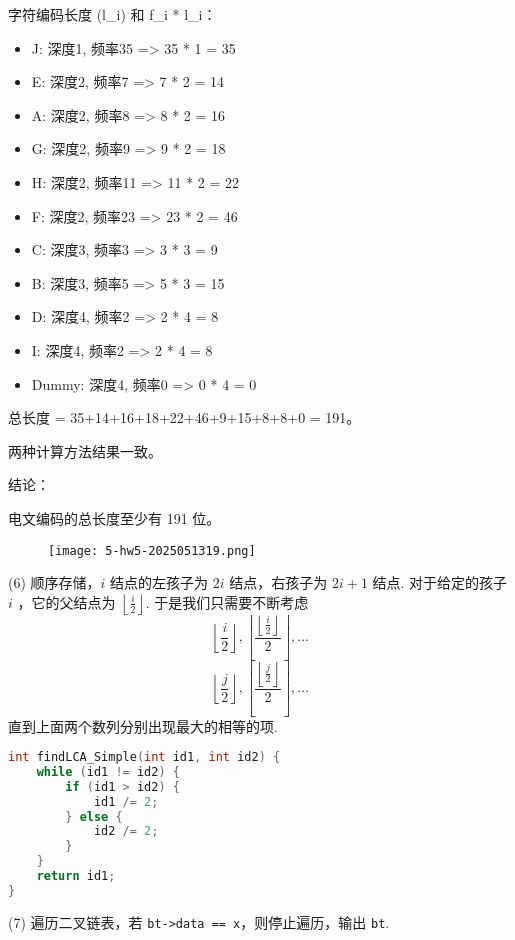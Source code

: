 字符编码长度 (l\_i) 和 f\_i * l\_i：

\begin{itemize}
	\item J: 深度1, 频率35 => 35 * 1 = 35
	\item E: 深度2, 频率7 => 7 * 2 = 14
	\item A: 深度2, 频率8 => 8 * 2 = 16
	\item G: 深度2, 频率9 => 9 * 2 = 18
	\item H: 深度2, 频率11 => 11 * 2 = 22
	\item F: 深度2, 频率23 => 23 * 2 = 46
	\item C: 深度3, 频率3 => 3 * 3 = 9
	\item B: 深度3, 频率5 => 5 * 3 = 15
	\item D: 深度4, 频率2 => 2 * 4 = 8
	\item I: 深度4, 频率2 => 2 * 4 = 8
	\item Dummy: 深度4, 频率0 => 0 * 4 = 0
\end{itemize}

总长度 = 35+14+16+18+22+46+9+15+8+8+0 = 191。

两种计算方法结果一致。

结论：

电文编码的总长度至少有 191 位。

\begin{figure}[H]
\centering
\texttt{[image: 5-hw5-2025051319.png]}
\label{}
\end{figure}

(6)
顺序存储，$i$ 结点的左孩子为 $2i$ 结点，右孩子为 $2i+1$ 结点. 对于给定的孩子 $i$ ，它的父结点为 $\left\lfloor  \frac{i}{2}  \right\rfloor$. 于是我们只需要不断考虑
\[
\left\lfloor  \frac{i}{2}  \right\rfloor ,\left\lfloor  \frac{\left\lfloor  \frac{i}{2}  \right\rfloor}{2}   \right\rfloor ,\dots
\]
\[
\left\lfloor  \frac{j}{2}  \right\rfloor ,\left\lfloor  \frac{\left\lfloor  \frac{j}{2}  \right\rfloor}{2}   \right\rfloor ,\dots
\]
直到上面两个数列分别出现最大的相等的项.

\begin{lstlisting}[language=C++]
int findLCA_Simple(int id1, int id2) {
    while (id1 != id2) {
        if (id1 > id2) {
            id1 /= 2;
        } else {
            id2 /= 2;
        }
    }
    return id1;
}
\end{lstlisting}
(7)
遍历二叉链表，若 \lstinline{bt->data == x}，则停止遍历，输出 \lstinline{bt}.

